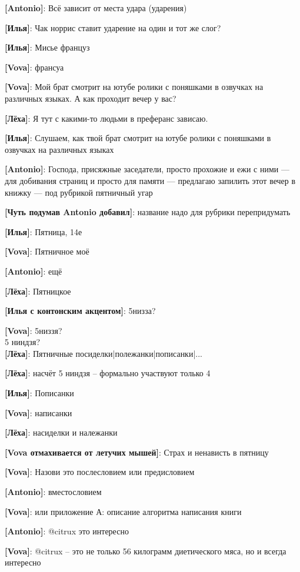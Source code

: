\begin{flushleft}
\textbf{[Antonio]}: Всё зависит от места удара (ударения)

\textbf{[Илья]}: Чак норрис ставит ударение на один и тот же слог?

\textbf{[Илья]}: Мисье француз

\textbf{[Vova]}: франсуа

\textbf{[Vova]}: Мой брат смотрит на ютубе ролики с поняшками в озвучках на различных языках. А как проходит вечер у вас?

\textbf{[Лёха]}: Я тут с какими-то людьми в преферанс зависаю.

\textbf{[Илья]}: Слушаем, как твой брат смотрит на ютубе ролики с поняшками в озвучках на различных языках

\textbf{[Antonio]}: Господа, присяжные заседатели, просто прохожие и ежи с ними --- для добивания страниц и просто для памяти --- предлагаю запилить этот вечер в книжку --- под рубрикой пятничный угар

\textbf{[Чуть подумав Antonio добавил]}: название надо для рубрики перепридумать

\textbf{[Илья]}: Пятница, 14е

\textbf{[Vova]}: Пятничное моё

\textbf{[Antonio]}: ещё

\textbf{[Лёха]}: Пятницкое

\textbf{[Илья с контонским акцентом]}: 5низза?

\textbf{[Vova]}: 5низзя?\\
5 ниндзя?\\

\textbf{[Лёха]}: Пятничные посиделки|полежанки|пописанки|...

\textbf{[Лёха]}: насчёт 5 ниндзя -- формально участвуют только 4

\textbf{[Илья]}: Пописанки

\textbf{[Vova]}: написанки

\textbf{[Лёха]}: насиделки и належанки

\textbf{[Vova отмахивается от летучих мышей]}: Страх и ненависть в пятницу

\textbf{[Vova]}: Назови это послесловием
или предисловием

\textbf{[Antonio]}: вместословием

\textbf{[Vova]}: или приложение А: описание алгоритма написания книги

\textbf{[Antonio]}: @citrux это интересно

\textbf{[Vova]}: @citrux -- это не только 56 килограмм диетического мяса, но и всегда интересно


\end{flushleft}
